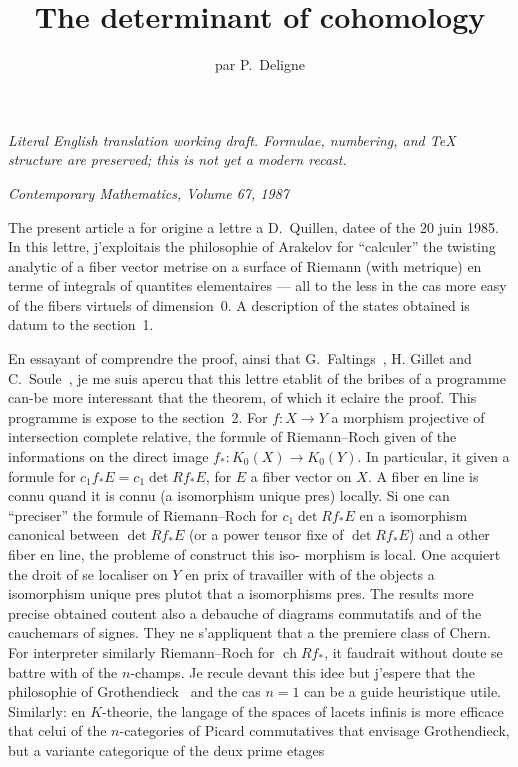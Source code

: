 \documentclass[12pt,a4paper]{article}
\title{The determinant of cohomology}
\author{par P.~Deligne}
\date{}
\theoremstyle{plain}
\theoremstyle{definition}
\DeclareMathOperator{\ch}{ch}
\begin{document}
\begin{center}\small\emph{Literal English translation working draft. Formulae, numbering, and TeX structure are preserved; this is not yet a modern recast.}\end{center}
\vspace{0.5em}


\maketitle

\thispagestyle{empty}

\begin{center}
\textit{Contemporary Mathematics, Volume 67, 1987}
\end{center}

\bigskip

The present article a for origine a lettre a D.~Quillen, datee of the 20 juin
1985. In this lettre, j'exploitais the philosophie of Arakelov for ``calculer''
the twisting analytic of a fiber vector metrise on a surface of Riemann
(with metrique) en terme of integrals of quantites elementaires --- all to the less
in the cas more easy of the fibers virtuels of dimension~0. A description
of the states obtained is datum to the section~1.

En essayant of comprendre the proof, ainsi that G.~Faltings~\cite{5}, H.
Gillet and C.~Soule~\cite{7}, je me suis apercu that this lettre etablit of the bribes
of a programme can-be more interessant that the theorem, of which it eclaire the
proof. This programme is expose to the section~2. For $f:X \to Y$ a
morphism projective of intersection complete relative, the formule of Riemann--Roch
given of the informations on the direct image $f_*: K_0(X) \to K_0(Y)$. In particular,
it given a formule for $c_1 f_* E = c_1 \det Rf_* E$, for $E$ a fiber vector on
$X$. A fiber en line is connu quand it is connu (a isomorphism unique pres)
locally. Si one can ``preciser'' the formule of Riemann--Roch for $c_1 \det Rf_* E$
en a isomorphism canonical between $\det Rf_* E$ (or a power tensor fixe
of $\det Rf_* E$) and a other fiber en line, the probleme of construct this iso-
morphism is local. One acquiert the droit of se localiser on $Y$ en prix of
travailler with of the objects a isomorphism unique pres plutot that a isomorphisms
pres. The results more precise obtained coutent also a debauche of diagrams
commutatifs and of the cauchemars of signes. They ne s'appliquent that a the premiere
class of Chern. For interpreter similarly Riemann--Roch for $\ch Rf_*$, it faudrait
without doute se battre with of the $n$-champs. Je recule devant this idee but j'espere
that the philosophie of Grothendieck~\cite{9} and the cas $n=1$ can be a guide
heuristique utile. Similarly: en $K$-theorie, the langage of the spaces of lacets
infinis is more efficace that celui of the $n$-categories of Picard commutatives
that envisage Grothendieck, but a variante categorique of the deux prime etages
\end{document}
